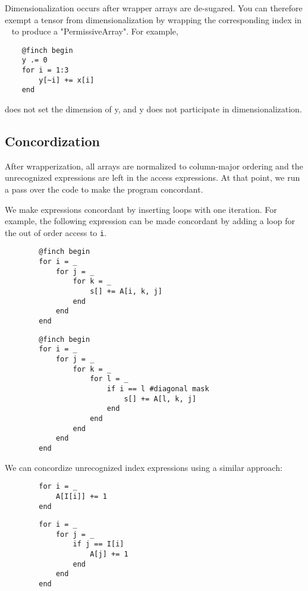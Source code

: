     Dimensionalization occurs after wrapper arrays are de-sugared. You can
    therefore exempt a tensor from dimensionalization by wrapping the
    corresponding index in ~ to produce a "PermissiveArray". For example,
    
    \begin{verbatim}
    @finch begin
    y .= 0
    for i = 1:3
        y[~i] += x[i]
    end
    \end{verbatim}
    
    does not set the dimension of y, and y does not participate in dimensionalization.
    
\subsection{Concordization}
    After wrapperization, all arrays are normalized to column-major ordering and
    the unrecognized expressions are left in the access expressions. At that
    point, we run a pass over the code to make the program concordant.
    
    We make expressions concordant by inserting loops with one iteration. For example, the following expression can be made concordant by adding a loop for the out of order access to \texttt{i}.
    \begin{verbatim}
        @finch begin
        for i = _
            for j = _
                for k = _
                    s[] += A[i, k, j]
                end
            end
        end
    \end{verbatim}

    \begin{verbatim}
        @finch begin
        for i = _
            for j = _
                for k = _
                    for l = _
                        if i == l #diagonal mask
                            s[] += A[l, k, j]
                        end
                    end
                end
            end
        end
    \end{verbatim}

    We can concordize unrecognized index expressions using a similar approach:

    \begin{verbatim}
        for i = _
            A[I[i]] += 1
        end
    \end{verbatim}

    \begin{verbatim}
        for i = _
            for j = _
                if j == I[i]
                    A[j] += 1
                end
            end
        end
    \end{verbatim}

